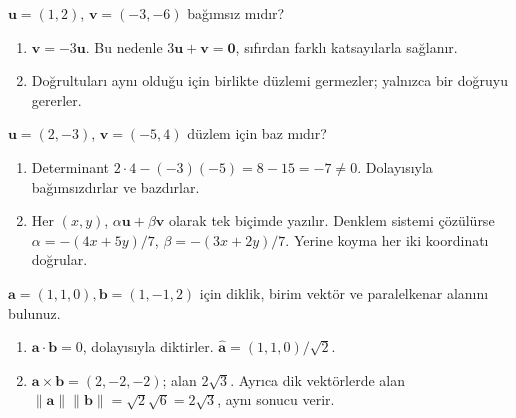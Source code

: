 \begin{tcolorbox}[title={Örnek 1.6 | Düzlemde bağımlı vektörler},colframe=accent]\(\mathbf u=(1,2)\), \(\mathbf v=(-3,-6)\) bağımsız mıdır?
\par{}\end{tcolorbox}
\begin{tcolorbox}[title={Adım adım çözüm},colback=green!3!white,colframe=green]\begin{enumerate}
\item \(\mathbf v=-3\mathbf u\). Bu nedenle \(3\mathbf u+\mathbf v=\mathbf0\), sıfırdan farklı katsayılarla sağlanır.
\item Doğrultuları aynı olduğu için birlikte düzlemi germezler; yalnızca bir doğruyu gererler.
\end{enumerate}\end{tcolorbox}
\begin{tcolorbox}[title={Örnek 1.7 | Düzlemde baz},colframe=accent]\(\mathbf u=(2,-3)\), \(\mathbf v=(-5,4)\) düzlem için baz mıdır?
\par{}\end{tcolorbox}
\begin{tcolorbox}[title={Adım adım çözüm},colback=green!3!white,colframe=green]\begin{enumerate}
\item Determinant \(2\cdot4-(-3)(-5)=8-15=-7\ne0\). Dolayısıyla bağımsızdırlar ve bazdırlar.
\item Her \((x,y)\), \(\alpha\mathbf u+\beta\mathbf v\) olarak tek biçimde yazılır. Denklem sistemi çözülürse \(\alpha=-(4x+5y)/7\), \(\beta=-(3x+2y)/7\). Yerine koyma her iki koordinatı doğrular.
\end{enumerate}\end{tcolorbox}
\begin{tcolorbox}[title={Örnek 1.8 | Pekiştirme},colframe=accent]\(\mathbf a=(1,1,0),\mathbf b=(1,-1,2)\) için diklik, birim vektör ve paralelkenar alanını bulunuz.
\par\vspace{1mm}{\scriptsize\sffamily Pekiştirme}\end{tcolorbox}
\begin{tcolorbox}[title={Adım adım çözüm},colback=green!3!white,colframe=green]\begin{enumerate}
\item \(\mathbf a\cdot\mathbf b=0\), dolayısıyla diktirler. \(\widehat{\mathbf a}=(1,1,0)/\sqrt2\).
\item \(\mathbf a\times\mathbf b=(2,-2,-2)\); alan \(2\sqrt3\). Ayrıca dik vektörlerde alan \(\|\mathbf a\|\|\mathbf b\|=\sqrt2\sqrt6=2\sqrt3\), aynı sonucu verir.
\end{enumerate}\end{tcolorbox}
